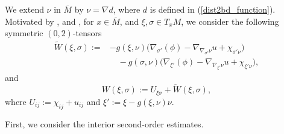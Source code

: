\documentclass[12pt]{amsart}
\theoremstyle{definition}
\theoremstyle{remark}
\numberwithin{equation}{section}
\begin{document}
We extend $\nu$ in $\overline{M}$ by $\nu = \nabla d$, where $d$ is defined in (\ref{dist2bd_function}). Motivated by \cite{LionsTrudUrbas86}, \cite{MaQiu19} and \cite{GuanXiang18}, for $x \in \overline{M}$, and $\xi, \sigma \in T_x M$, we consider the following symmetric $(0, 2)$-tensors
\begin{equation}\label{tilde(W)}
\begin{aligned}
\tilde{W}(\xi, \sigma) :=& - g(\xi, \nu) \Big( \nabla_{\sigma'}(\phi) - \nabla_{\nabla_{\sigma'}\nu} u  + \chi_{\sigma'\nu}\Big) \\
& \quad - g(\sigma, \nu) \Big( \nabla_{\xi'}(\phi) - \nabla_{\nabla_{\xi'}\nu} u  + \chi_{\xi'\nu}\Big),
\end{aligned}
\end{equation}
and
\begin{equation}\label{W_func}
W(\xi, \sigma) := U_{\xi\sigma} + \tilde{W}(\xi, \sigma),
\end{equation}
where $U_{ij} := \chi_{ij} + u_{ij}$ and $\xi' := \xi - g(\xi, \nu)\nu$.







First, we consider the interior second-order estimates.
\end{document}
